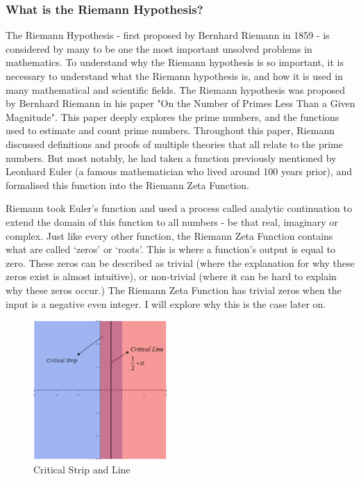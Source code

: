 \documentclass[12pt]{article}
\begin{document}
\subsubsection{What is the Riemann Hypothesis?}

The Riemann Hypothesis - first proposed by Bernhard Riemann in 1859 - is considered by many to be one the most important unsolved problems in mathematics. To understand why the Riemann hypothesis is so important, it is necessary to understand what the Riemann hypothesis is, and how it is used in many mathematical and scientific fields.
The Riemann hypothesis was proposed by Bernhard Riemann in his paper "On the Number of Primes Less Than a Given Magnitude". This paper deeply explores the prime numbers, and the functions used to estimate and count prime numbers. Throughout this paper, Riemann discussed definitions and proofs of multiple theories that all relate to the prime numbers. But most notably, he had taken a function previously mentioned by Leonhard Euler (a famous mathematician who lived around 100 years prior), and formalised this function into the Riemann Zeta Function.


Riemann took Euler’s function and used a process called analytic continuation to extend the domain of this function to all numbers - be that real, imaginary or complex. Just like every other function, the Riemann Zeta Function contains what are called ‘zeros’ or ‘roots’. This is where a function’s output is equal to zero. These zeros can be described as trivial (where the explanation for why these zeros exist is almost intuitive), or non-trivial (where it can be hard to explain why these zeros occur.) The Riemann Zeta Function has trivial zeros when the input is a negative even integer. I will explore why this is the case later on.

\begin{figure}
    \centering
    \includegraphics[width=2.0in]{critical-strip}
    \caption{Critical Strip and Line}
\end{figure}
\end{document}
